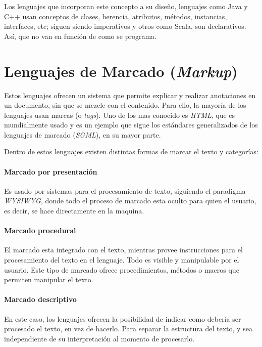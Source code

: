 \documentclass[12pt,letterpaper,titlepage,oneside,openright]{book}
\begin{document}
Los lenguajes que incorporan este concepto a su diseño, lenguajes como Java y C++ usan conceptos de clases, herencia, atributos, métodos, instancias, interfaces, etc; siguen siendo imperativos y otros como Scala, son declarativos. Así, que no van en función de como se programa.

\section{Lenguajes de Marcado (\textit{Markup})}

Estos lenguajes ofrecen un sistema que permite explicar y realizar anotaciones en un documento, sin que se mezcle con el contenido. Para ello, la mayoría de los lenguajes usan marcas (o \textit{tags}). Uno de los mas conocido es \textit{HTML}, que es mundialmente usado y es un ejemplo que sigue los estándares generalizados de los lenguajes de marcado (\textit{SGML}), en su mayor parte.

Dentro de estos lenguajes existen distintas formas de marcar el texto y categorías:

\paragraph{Marcado por presentación}

Es usado por sistemas para el procesamiento de texto, siguiendo el paradigma \textit{WYSIWYG}, donde todo el proceso de marcado esta oculto para quien el usuario, es decir, se hace directamente en la maquina.

\paragraph{Marcado procedural}

El marcado esta integrado con el texto, mientras provee instrucciones para el procesamiento del texto en el lenguaje. Todo es visible y manipulable por el usuario. Este tipo de marcado ofrece procedimientos, métodos o macros que permiten manipular el texto.

\paragraph{Marcado descriptivo}

En este caso, los lenguajes ofrecen la posibilidad de indicar como debería ser procesado el texto, en vez de hacerlo. Para separar la estructura del texto, y sea independiente de su interpretación al momento de procesarlo.
\end{document}
